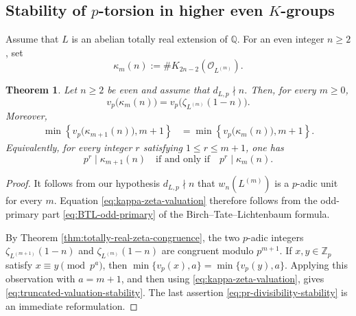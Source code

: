 \documentclass[11pt,table]{amsart}
\newtheorem{theorem}{Theorem}[section]
\newcommand{\Q}{\mathbb{Q}}
\numberwithin{equation}{section}
\begin{document}
\subsection{Stability of \(p\)-torsion in higher even \(K\)-groups}
\label{subsec:K-group-stability}
\par Assume that $L$ is an abelian totally real extension of $\Q$. For an even integer \(n\geq 2\), set
\begin{equation}
        \kappa_m(n)
        :=
        \#K_{2n-2}(\mathcal O_{L^{(m)}}).
        \label{eq:def-kappa}
\end{equation}


\begin{theorem}
\label{thm:K-group-congruence-application}
Let \(n\geq 2\) be even and assume that
\(d_{L,p}\nmid n\). Then, for every \(m\geq 0\),
\begin{equation}
        v_p\bigl(\kappa_m(n)\bigr)
        =
        v_p\bigl(\zeta_{L^{(m)}}(1-n)\bigr).
        \label{eq:kappa-zeta-valuation}
\end{equation}
Moreover,
\begin{equation}
\begin{split}
        \min\!\left\{
        v_p\bigl(\kappa_{m+1}(n)\bigr),m+1
        \right\}
        &=
        \min\!\left\{
        v_p\bigl(\kappa_m(n)\bigr),m+1
        \right\}.
\end{split}
        \label{eq:truncated-valuation-stability}
\end{equation}
Equivalently, for every integer \(r\) satisfying
\(1\leq r\leq m+1\), one has
\begin{equation}
        p^r\mid\kappa_{m+1}(n)
        \quad\text{if and only if}\quad
        p^r\mid\kappa_m(n).
        \label{eq:pr-divisibility-stability}
\end{equation}
\end{theorem}

\begin{proof}
It follows from our hypothesis $d_{L,p}\nmid n$ that \(w_n(L^{(m)})\) is a \(p\)-adic unit for every \(m\).
Equation \eqref{eq:kappa-zeta-valuation} therefore follows from the
odd-primary part \eqref{eq:BTL-odd-primary} of the
Birch--Tate--Lichtenbaum formula.

\par By Theorem \ref{thm:totally-real-zeta-congruence}, the two
\(p\)-adic integers \(\zeta_{L^{(m+1)}}(1-n)\) and
\(\zeta_{L^{(m)}}(1-n)\) are congruent modulo \(p^{m+1}\). If
\(x,y\in\mathbb Z_p\) satisfy \(x\equiv y\pmod{p^a}\), then
\(\min\{v_p(x),a\}=\min\{v_p(y),a\}\). Applying this observation with
\(a=m+1\), and then using \eqref{eq:kappa-zeta-valuation}, gives
\eqref{eq:truncated-valuation-stability}.
The last assertion \eqref{eq:pr-divisibility-stability} is an immediate
reformulation.
\end{proof}
\end{document}
